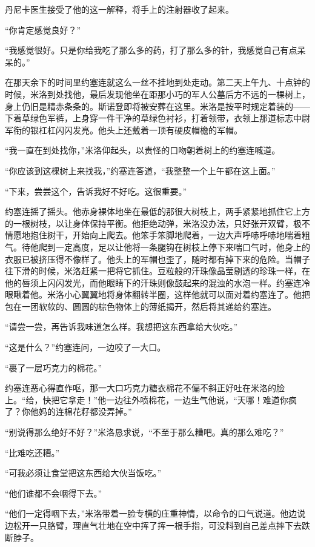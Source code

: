     丹尼卡医生接受了他的这一解释，将手上的注射器收了起来。

    “你肯定感觉良好？”

    “我感觉很好。只是你给我吃了那么多的药，打了那么多的针，我感觉自己有点呆呆的。”

    在那天余下的时间里约塞连就这么一丝不挂地到处走动。第二天上午九、十点钟的时候，米洛到处找他，最后发现他坐在距那小巧的军人公墓后方不远的一棵树上，身上仍旧是精赤条条的。斯诺登即将被安葬在这里。米洛是按平时规定着装的——下着草绿色军裤，上身穿一件干净的草绿色衬衫，打着领带，衣领上那道标志中尉军衔的银杠杠闪闪发亮。他头上还戴着一顶有硬皮帽檐的军帽。

    “我一直在到处找你，”米洛仰起头，以责怪的口吻朝着树上的约塞连喊道。

    “你应该到这棵树上来找我，”约塞连答道，“我整整一个上午都在这上面。”

    “下来，尝尝这个，告诉我好不好吃。这很重要。”

    约塞连摇了摇头。他赤身裸体地坐在最低的那很大树枝上，两手紧紧地抓住它上方的一根树枝，以让身体保持平衡。他拒绝动弹，米洛没办法，只好张开双臂，极不情愿地抱住树干，开始向上爬去。他笨手笨脚地爬着，一边大声呼哧呼哧地喘着粗气。待他爬到一定高度，足以让他将一条腿钩在树枝上停下来喘口气时，他身上的衣服已被挤压得不像样了。他头上的军帽也歪了，随时都有掉下来的危险。当帽子往下滑的时候，米洛赶紧一把将它抓住。豆粒般的汗珠像晶莹剔透的珍珠一样，在他的唇须上闪闪发光，而他眼睛下的汗珠则像鼓起来的混浊的水泡一样。约塞连冷眼瞅着他。米洛小心翼翼地将身体翻转半圈，这样他就可以面对着约塞连了。他把包在一团软软的、圆圆的棕色物体上的薄纸揭开，然后将其递给约塞连。

    “请尝一尝，再告诉我味道怎么样。我想把这东西拿给大伙吃。”

    “这是什么？”约塞连问，一边咬了一大口。

    “裹了一层巧克力的棉花。”

    约塞连恶心得直作呕，那一大口巧克力糖衣棉花不偏不斜正好吐在米洛的脸上。“给，快把它拿走！”他一边往外喷棉花，一边生气他说，“天哪！难道你疯了？你他妈的连棉花籽都没弄掉。”

    “别说得那么绝好不好？”米洛恳求说，“不至于那么糟吧。真的那么难吃？”

    “比难吃还糟。”

    “可我必须让食堂把这东西给大伙当饭吃。”

    “他们谁都不会咽得下去。”

    “他们一定得咽下去，”米洛带着一脸专横的庄重神情，以命令的口气说道。他边说边松开一只胳臂，理直气壮地在空中挥了挥一根手指，可没料到自己差点摔下去跌断脖子。

